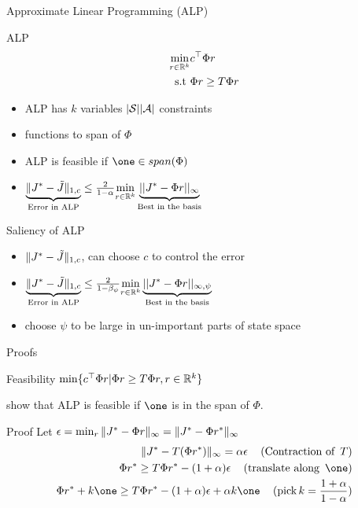 \documentclass[10pt,handout]{beamer}
\begin{document}
\begin{frame}[fragile]{Approximate Linear Programming (ALP)}
\begin{block}{ALP \cite{schweitzer1985generalized,de2003linear}}
\begin{align*}
\min_{r\in \mathbb{R}^k} &c^\top \Phi r\\
\text{s.t}\mbox{ } &\Phi r\geq T \Phi r
\end{align*}
\end{block}

\begin{itemize}
\item ALP has $k$ variables $|\mathcal{S}||\mathcal{A}|$ constraints
\item {\color{orange}{superharmonic}} functions {\color{orange}{restricted}} to span of $\Phi$
\item ALP is feasible if $\one \in span(\Phi)$
\item $\underbrace{\|J^*-\tilde{J}\|_{1,c}}_{\text{Error in ALP}}\leq \frac{2}{1-\alpha}\underset{r\in \mathbb{R}^k}{\min}\underbrace{||J^*-\Phi r||_{\infty}}_{\text{Best in the basis}}$
\end{itemize}
\end{frame}

\begin{frame}[fragile]{Saliency of ALP}
\begin{itemize}
\item $\|J^*-\tilde{J}\|_{1,c}$, can choose $c$ to control the error
\item $\underbrace{\|J^*-\tilde{J}\|_{1,c}}_{\text{Error in ALP}}\leq \frac{2}{1-\beta_\psi}\underset{r\in \mathbb{R}^k}{\min}\underbrace{||J^*-\Phi r||_{\infty,\psi}}_{\text{Best in the basis}}$
\item \cite{de2003linear,de2004constraint} choose $\psi$ to be large in un-important parts of state space
\end{itemize}


\end{frame}

\begin{frame}[fragile]{Proofs}
\begin{block}{Feasibility}
$\min\{ c^\top \Phi r | \Phi r\geq T \Phi r, r\in \mathbb{R}^k\}$
\end{block}
\cite{de2003linear} show that ALP is feasible if $\one$ is in the span of $\Phi$.
\begin{block}{Proof}
Let $\epsilon=\min_r \|J^*-\Phi r\|_\infty=\|J^*-\Phi r^*\|_\infty$
\begin{align*}
\norm{J^*-T (\Phi r^*)}_\infty=\alpha \epsilon\,\quad(\text{Contraction~of~}\,T)\\
\Phi r^* \geq T \Phi r^* -(1+\alpha)\epsilon\,\quad(\text{translate~along~}\,\one)\\
\Phi r^* + k\one\geq T \Phi r^* -(1+\alpha)\epsilon +\alpha k\one\,\quad(\text{pick}\,k=\frac{1+\alpha}{1-\alpha})\\
\end{align*}
\end{block}
\end{frame}
\end{document}
